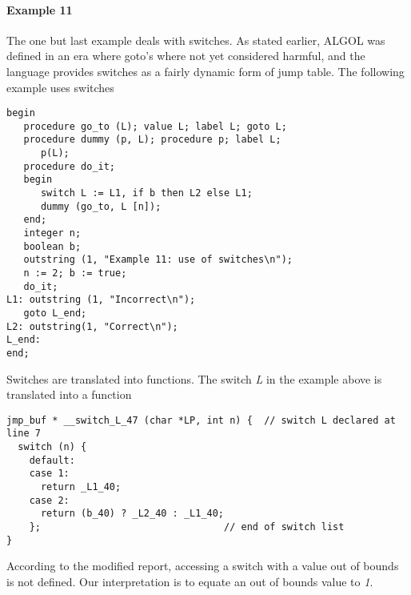 \documentclass[11pt]{article}
\begin{document}
\paragraph{Example 11}
The one but last example deals with switches. As stated earlier, ALGOL was defined in
an era where goto's where not yet considered harmful, and the language
provides switches as a fairly dynamic form of jump table.
The following example uses switches
{\footnotesize
\begin{verbatim}
begin
   procedure go_to (L); value L; label L; goto L;
   procedure dummy (p, L); procedure p; label L;
      p(L);
   procedure do_it;
   begin
      switch L := L1, if b then L2 else L1;
      dummy (go_to, L [n]);
   end;
   integer n;
   boolean b;
   outstring (1, "Example 11: use of switches\n");
   n := 2; b := true;
   do_it;
L1: outstring (1, "Incorrect\n");
   goto L_end;
L2: outstring(1, "Correct\n");
L_end:
end;
\end{verbatim}
}
Switches are translated into functions.
The switch {\em L} in the example
above is translated into a function
{\footnotesize
\begin{verbatim}
jmp_buf * __switch_L_47 (char *LP, int n) {  // switch L declared at line 7
  switch (n) {
    default:
    case 1:
      return _L1_40;
    case 2:
      return (b_40) ? _L2_40 : _L1_40;
    };                                // end of switch list 
}
\end{verbatim}
}
According to the modified report, accessing a switch with a value out of
bounds is not defined. Our interpretation is to equate an out of bounds
value to {\em 1}.
\end{document}
